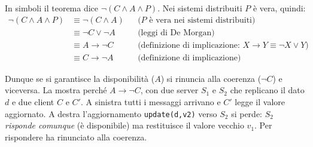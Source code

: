 In simboli il teorema dice $\neg(C \wedge A \wedge P)$. Nei sistemi distribuiti $P$ è vera, quindi:
\begin{align*}
\neg(C \wedge A \wedge P) &\equiv \neg(C \wedge A) && \text{($P$ è vera nei sistemi distribuiti)}\\
&\equiv \neg C \vee \neg A && \text{(leggi di De Morgan)}\\
&\equiv A \rightarrow \neg C && \text{(definizione di implicazione: $X \rightarrow Y \equiv \neg X \vee Y$)}\\
&\equiv C \rightarrow \neg A && \text{(definizione di implicazione)}
\end{align*}

Dunque se si garantisce la disponibilità ($A$) si rinuncia alla coerenza ($\neg C$) e viceversa. La
 mostra perché $A \rightarrow \neg C$, con due server $S_1$ e $S_2$ che replicano il dato $d$ e due
client $C$ e $C'$. A sinistra tutti i messaggi arrivano e $C'$ legge il valore aggiornato. A destra l'aggiornamento
\texttt{update(d,v2)} verso $S_2$ si perde: $S_2$ \emph{risponde comunque} (è disponibile) ma restituisce il valore vecchio
$v_1$. Per rispondere ha rinunciato alla coerenza.

